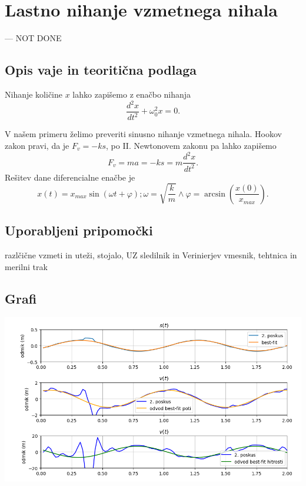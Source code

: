 \documentclass[12pt]{article}
\begin{document}
\section{Lastno nihanje vzmetnega nihala}  --- NOT DONE
	\subsection*{Opis vaje in teoritična podlaga}
	Nihanje količine $x$ lahko zapišemo z enačbo nihanja
	\begin{equation}
		\frac{d^2 x}{dt^2} + \omega_0^2 x = 0 .
	\end{equation}

 

	V našem primeru želimo preveriti sinusno nihanje vzmetnega nihala.
	Hookov zakon pravi, da je $F_v = -ks$, po II. Newtonovem zakonu pa lahko zapišemo 
	\begin{equation}
		F_v = ma = -ks = m \frac{d^2 x}{dt^2} .
	\end{equation}
	Rešitev dane diferencialne enačbe je
	\begin{equation}
		x(t) = x_{max} \sin(\omega t + \varphi); \omega = \sqrt{\frac k m} \land \varphi = \arcsin(\frac{x(0)}{x_{max}}).
	\end{equation}
	
	\subsection*{Uporabljeni pripomočki}
	razlčične vzmeti in uteži, stojalo, UZ sledilnik in Verinierjev vmesnik, tehtnica in merilni trak
	\subsection*{Grafi}
	\includegraphics[width=\linewidth]{slike/graf_v1_1.png}
\end{document}
